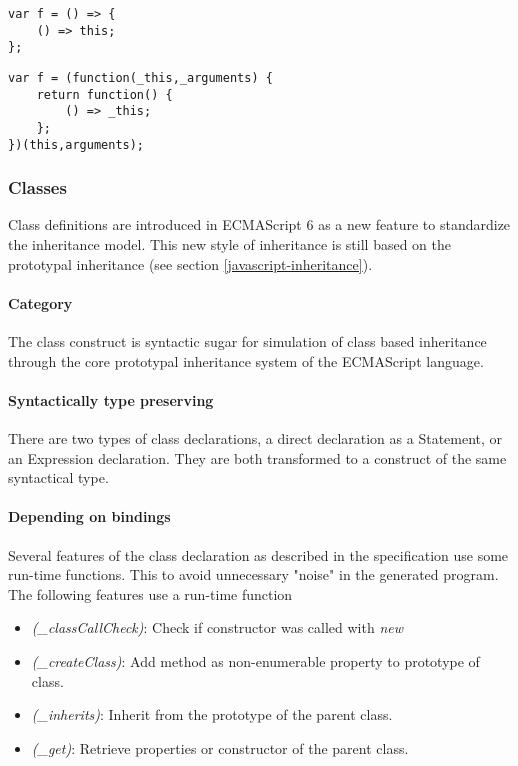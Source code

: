 \begin{lstlisting}
var f = () => {
	() => this;
};
\end{lstlisting}

\begin{lstlisting}[caption={Incorrect renaming of this in nested arrow function}]
var f = (function(_this,_arguments) {
	return function() {	
		() => _this;
	};
})(this,arguments);
\end{lstlisting}

\subsubsection{Classes}
Class definitions\cite[14.5]{SpecJS} are introduced in ECMAScript 6 as a new feature to standardize the inheritance model. 
This new style of inheritance is still based on the prototypal inheritance (see section \ref{javascript-inheritance}).

\paragraph{Category}
The class construct is syntactic sugar for simulation of class based inheritance through the core prototypal inheritance system of the ECMAScript language.

\paragraph{Syntactically type preserving}
There are two types of class declarations, a direct declaration as a Statement, or an Expression declaration. They are both transformed to a construct of the same syntactical type.

\paragraph{Depending on bindings}
Several features of the class declaration as described in the specification use some run-time functions. This to avoid unnecessary "noise" in the generated program. The following features use a run-time function

\begin{itemize}
	\item \textit{(\_classCallCheck)}: Check if constructor was called with \textit{new} 
	\item \textit{(\_createClass)}: Add method as non-enumerable property to prototype of class. 
	\item \textit{(\_inherits)}: Inherit from the prototype of the parent class. 
	\item \textit{(\_get)}: Retrieve properties or constructor of the parent class.
\end{itemize}

